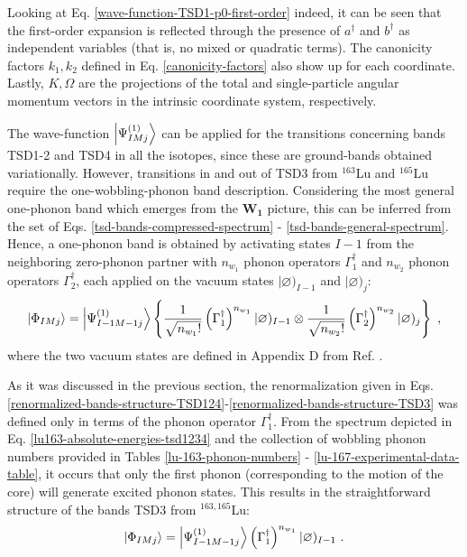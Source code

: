 Looking at Eq. \ref{wave-function-TSD1-p0-first-order} indeed, it can be seen that the first-order expansion is reflected through the presence of $a^\dagger$ and $b^\dagger$ as independent variables (that is, no mixed or quadratic terms). The canonicity factors $k_1,k_2$ defined in Eq. \ref{canonicity-factors} also show up for each coordinate. Lastly, $K,\Omega$ are the projections of the total and single-particle angular momentum vectors in the intrinsic coordinate system, respectively.

The wave-function $\ket{\Psi_{IMj}^{(1)}}$ can be applied for the transitions concerning bands TSD1-2 and TSD4 in all the isotopes, since these are ground-bands obtained variationally. However, transitions in and out of TSD3 from $^{163}$Lu and $^{165}$Lu require the one-wobbling-phonon band description. Considering the most general one-phonon band which emerges from the $\mathbf{W_1}$ picture, this can be inferred from the set of Eqs. \ref{tsd-bands-compressed-spectrum} - \ref{tsd-bands-general-spectrum}. Hence, a one-phonon band is obtained by activating states $I-1$ from the neighboring zero-phonon partner with $n_{w_1}$ phonon operators $\Gamma_1^\dagger$ and $n_{w_2}$ phonon operators $\Gamma_2^\dagger$, each applied on the vacuum states $|\varnothing)_{I-1}$ and $|\varnothing)_j$:
\begin{align}
    \ket{\Phi_{IMj}}=\ket{\Psi_{I-1M-1j}^{(1)}}\left\{\frac{1}{\sqrt{n_{w_1}!}}\left(\Gamma_1^\dagger\right)^{n_{w_1}}|\varnothing)_{I-1}\otimes\frac{1}{\sqrt{n_{w_2}!}}\left(\Gamma_2^\dagger\right)^{n_{w_2}}|\varnothing)_j\right\}\ ,
    \label{wave-function-TSD-excited-phonon-state}
\end{align}
where the two vacuum states are defined in Appendix D from Ref. \cite{raduta2017semiclassical}.

As it was discussed in the previous section, the renormalization given in Eqs. \ref{renormalized-bands-structure-TSD124}-\ref{renormalized-bands-structure-TSD3} was defined only in terms of the phonon operator $\Gamma_1^\dagger$. From the spectrum depicted in Eq. \ref{lu163-absolute-energies-tsd1234} and the collection of wobbling phonon numbers provided in Tables \ref{lu-163-phonon-numbers} - \ref{lu-167-experimental-data-table}, it occurs that only the first phonon (corresponding to the motion of the core) will generate excited phonon states. This results in the straightforward structure of the bands TSD3 from $^{163,165}$Lu:
\begin{align}
    \ket{\Phi_{IMj}}=\ket{\Psi_{I-1M-1j}^{(1)}}\left(\Gamma_1^\dagger\right)^{n_{w_1}}|\varnothing)_{I-1}\ .
    \label{wave-function-TSD3}
\end{align}

